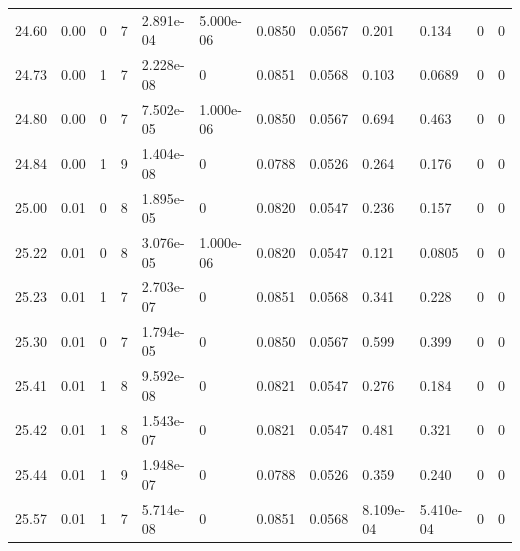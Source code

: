 \documentclass[preview]{standalone}
\begin{document}
{{{{{{\begin{tabular}{L{1.2cm}C{1.2cm} C{0.3cm}C{0.5cm} C{1.4cm}C{1.4cm} C{1.4cm}C{1.4cm} C{1.6cm}C{1.6cm} C{1.6cm}C{1.6cm}}
  24.60  &  0.00  & 0     &  7 &  2.891e-04  & 5.000e-06  &  0.0850&   0.0567& 0.201 & 0.134   &  0 & 0  \\ 
  24.73  &  0.00  & 1     &  7 &  2.228e-08  & 0  &  0.0851&   0.0568& 0.103 & 0.0689   &  0 & 0  \\ 
  24.80  &  0.00  & 0     &  7 &  7.502e-05  & 1.000e-06  &  0.0850&   0.0567& 0.694 & 0.463   &  0 & 0  \\ 
  24.84  &  0.00  & 1     &  9 &  1.404e-08  & 0  &  0.0788&   0.0526& 0.264 & 0.176   &  0 & 0  \\ 
  25.00  &  0.01  & 0     &  8 &  1.895e-05  & 0  &  0.0820&   0.0547& 0.236 & 0.157   &  0 & 0  \\ 
  25.22  &  0.01  & 0     &  8 &  3.076e-05  & 1.000e-06  &  0.0820&   0.0547& 0.121 & 0.0805   &  0 & 0  \\ 
  25.23  &  0.01  & 1     &  7 &  2.703e-07  & 0  &  0.0851&   0.0568& 0.341 & 0.228   &  0 & 0  \\ 
  25.30  &  0.01  & 0     &  7 &  1.794e-05  & 0  &  0.0850&   0.0567& 0.599 & 0.399   &  0 & 0  \\ 
  25.41  &  0.01  & 1     &  8 &  9.592e-08  & 0  &  0.0821&   0.0547& 0.276 & 0.184   &  0 & 0  \\ 
  25.42  &  0.01  & 1     &  8 &  1.543e-07  & 0  &  0.0821&   0.0547& 0.481 & 0.321   &  0 & 0  \\ 
  25.44  &  0.01  & 1     &  9 &  1.948e-07  & 0  &  0.0788&   0.0526& 0.359 & 0.240   &  0 & 0  \\ 
  25.57  &  0.01  & 1     &  7 &  5.714e-08  & 0  &  0.0851&   0.0568& 8.109e-04 & 5.410e-04   &  0 & 0  \\ 
\hline 
\end{tabular} 

}}}}}}
\end{document}
